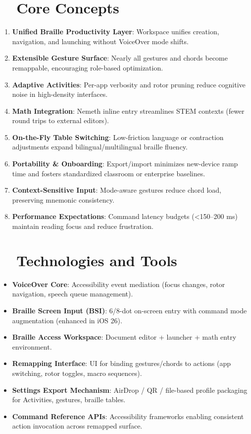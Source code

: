 \section{~~Core Concepts}
\label{sec:sr30-core-concepts}
\begin{enumerate}
	\item \textbf{Unified Braille Productivity Layer}: Workspace unifies creation, navigation, and launching without VoiceOver mode shifts.
	\item \textbf{Extensible Gesture Surface}: Nearly all gestures and chords become remappable, encouraging role-based optimization\supercite{hks2025}.
	\item \textbf{Adaptive Activities}: Per-app verbosity and rotor pruning reduce cognitive noise in high-density interfaces\supercite{applevisVO2024}.
	\item \textbf{Math Integration}: Nemeth inline entry streamlines STEM contexts (fewer round trips to external editors)\supercite{appleSupportBSI2025}.
	\item \textbf{On-the-Fly Table Switching}: Low-friction language or contraction adjustments expand bilingual/multilingual braille fluency.
	\item \textbf{Portability \& Onboarding}: Export/import minimizes new-device ramp time and fosters standardized classroom or enterprise baselines.
	\item \textbf{Context-Sensitive Input}: Mode-aware gestures reduce chord load, preserving mnemonic consistency.
	\item \textbf{Performance Expectations}: Command latency budgets (<150–200 ms) maintain reading focus and reduce frustration.
\end{enumerate}

\section{~~Technologies and Tools}
\label{sec:sr30-technologies}
\begin{itemize}
	\item \textbf{VoiceOver Core}: Accessibility event mediation (focus changes, rotor navigation, speech queue management)\supercite{applevisVO2024}.
	\item \textbf{Braille Screen Input (BSI)}: 6/8-dot on-screen entry with command mode augmentation (enhanced in iOS 26)\supercite{appleSupportBSI2025}.
	\item \textbf{Braille Access Workspace}: Document editor + launcher + math entry environment\supercite{myvision2025}.
	\item \textbf{Remapping Interface}: UI for binding gestures/chords to actions (app switching, rotor toggles, macro sequences)\supercite{hks2025}.
	\item \textbf{Settings Export Mechanism}: AirDrop / QR / file-based profile packaging for Activities, gestures, braille tables\supercite{myvision2025}.
	\item \textbf{Command Reference APIs}: Accessibility frameworks enabling consistent action invocation across remapped surface.
\end{itemize}

